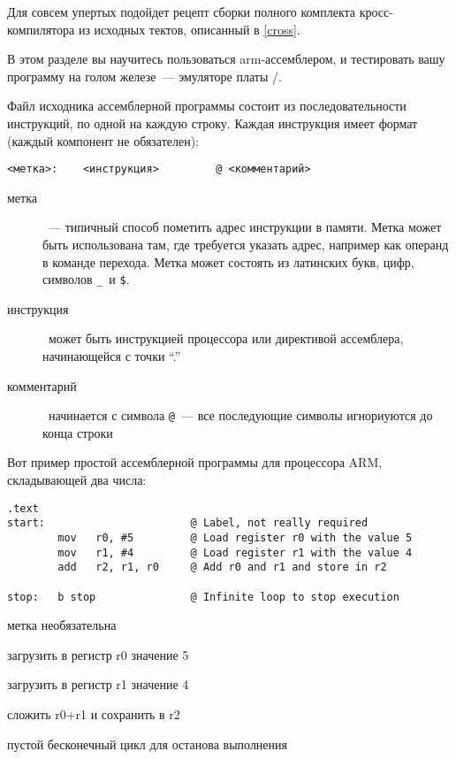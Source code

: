 Для совсем упертых подойдет рецепт сборки полного комплекта кросс-компилятора из
исходных тектов, описанный в \ref{cross}.

\secup
{}\secdown

В этом разделе вы научитесь пользоваться arm-ассемблером, и тестировать вашу
программу на голом железе\ --- эмуляторе платы /\qemu.

Файл исходника ассемблерной программы состоит из последовательности инструкций,
по одной на каждую строку. Каждая инструкция имеет формат (каждый
компонент не обязателен):

\begin{verbatim}
<метка>:    <инструкция>         @ <комментарий>
\end{verbatim}

\begin{description}
\item[метка]\ --- типичный способ пометить адрес инструкции в памяти. Метка
может быть использована там, где требуется указать адрес, например как операнд
в команде перехода. Метка может состоять из латинских букв, цифр, символов \verb|_|\ и \verb|$|.
\item[инструкция]\ может быть инструкцией процессора или директивой ассемблера,
начинающейся с точки ``.''
\item[комментарий]\ начинается с символа \verb|@|\ --- все последующие символы
игнориуются до конца строки
\end{description}

Вот пример простой ассемблерной программы для процессора ARM, складывающей
два числа:

\begin{lstlisting}[title=Листинг 1: Сложение чисел]
        .text
start:                       @ Label, not really required
        mov   r0, #5         @ Load register r0 with the value 5
        mov   r1, #4         @ Load register r1 with the value 4
        add   r2, r1, r0     @ Add r0 and r1 and store in r2

stop:   b stop               @ Infinite loop to stop execution
\end{lstlisting}

метка необязательна

загрузить в регистр r0 значение 5

загрузить в регистр r1 значение 4

сложить r0+r1 и сохранить в r2

пустой бесконечный цикл для останова выполнения

